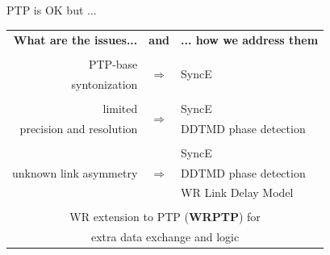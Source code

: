 \documentclass[compress,red]{beamer}
\begin{document}
\subsection{}
\begin{frame}{PTP is OK but ...}

  \resizebox{11cm}{!} 
  {
    \begin{tabular}{ r c l }
  {\bf What are the issues...} 	& {\bf and}      & {\bf ... how we address them}  \\
				&     		 &        \\
      PTP-base		 	& \multirow{2}{*}{$\Rightarrow$}  & \multirow{2}{*}{SyncE }\\
      syntonization	        &      		 &        \\
				&      		 &        			\\
      limited             	&\multirow{2}{*}{$\Rightarrow$}  	 & SyncE \\
      precision and resolution  &      		 & DDTMD phase detection\\
				&    		 &        \\
			        &      		 & SyncE  \\
      unknown link asymmetry    & $\Rightarrow$  & DDTMD phase detection \\
				&      		 & WR Link Delay Model \\
				&      		 &        \\
      \multicolumn{3}{c}{WR extension to PTP ({\bf WRPTP}) for } \\
      \multicolumn{3}{c}{extra data exchange and logic} \\
    \end{tabular}
  }
\end{frame}
\end{document}
